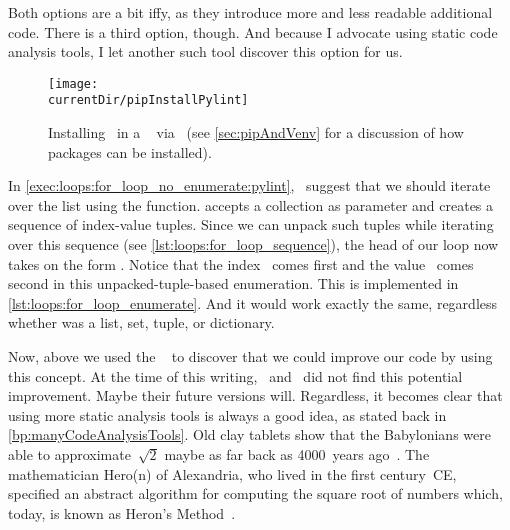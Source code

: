 Both options are a bit iffy, as they introduce more and less readable additional code.
There is a third option, though.
And because I advocate using static code analysis tools, I let another such tool discover this option for us.%
%
\begin{figure}%
\centering%
\texttt{[image: \\currentDir/pipInstallPylint]}%
\caption{Installing \pylint\ in a \ubuntu\  via \pip~(see \cref{sec:pipAndVenv} for a discussion of how packages can be installed).}%
\label{fig:pipInstallPylint}%
\end{figure}%
%
%
%
%
%
%
%
In \cref{exec:loops:for_loop_no_enumerate:pylint}, \pylint\ suggest that we should iterate over the list  using the  function.
 accepts a collection as parameter and creates a sequence of index-value tuples.
Since we can unpack such tuples while iterating over this sequence (see \cref{lst:loops:for_loop_sequence}), the head of our loop now takes on the form .
Notice that the index~ comes first and the value~ comes second in this unpacked-tuple-based enumeration.
This is implemented in \cref{lst:loops:for_loop_enumerate}.
And it would work exactly the same, regardless whether  was a list, set, tuple, or dictionary.

Now, above we used the \pylint\  to discover that we could improve our code by using this concept.
At the time of this writing, \ruff\ and \mypy\ did not find this potential improvement.
Maybe their future versions will.
Regardless, it becomes clear that using more static analysis tools is always a good idea, as stated back in \cref{bp:manyCodeAnalysisTools}.%
%
\FloatBarrier%
\endhsection%
%
%
\label{sec:whileLoop}%
%
Old clay tablets show that the Babylonians were able to approximate~$\sqrt{2}$ maybe as far back as 4000~years ago~\cite{FR1998SRAIOBMY7IC,S2011NA2}.
The mathematician Hero(n) of Alexandria, who lived in the first century~CE, specified an abstract algorithm for computing the square root of numbers which, today, is known as Heron's Method~\cite{S2011NA2,K2009BMOCTSRJBOFTAOCC}.

